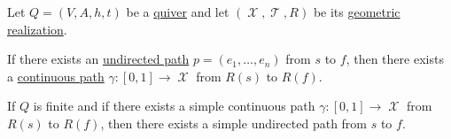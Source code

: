 \begin{proposition}\label{thm:quiver_geometric_realization_paths}
  Let \( Q = (V, A, h, t) \) be a \hyperref[def:quiver]{quiver} and let \( (\mscrX, \mscrT, R) \) be its \hyperref[def:quiver_geometric_realization]{geometric realization}.

  \begin{thmenum}
     If there exists an \hyperref[def:quiver_path/undirected]{undirected path} \( p = (e_1, \ldots, e_n) \) from \( s \) to \( f \), then there exists a \hyperref[def:parametric_curve]{continuous path} \( \gamma: [0, 1] \to \mscrX \) from \( R(s)  \) to \( R(f) \).

     If \( Q \) is finite and if there exists a simple continuous path \( \gamma: [0, 1] \to \mscrX \) from \( R(s)  \) to \( R(f) \), then there exists a simple undirected path from \( s \) to \( f \).
  \end{thmenum}
\end{proposition}
